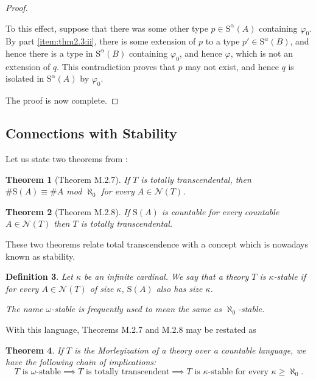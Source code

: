 \documentclass{article}
\newtheorem{theorem}{Theorem}[section]
\newtheorem{definition}[theorem]{Definition}
\theoremstyle{nonumberplain}
\newtheorem{proof}{Proof}
\newcommand{\calN}{\mathcal{N}}
\newcommand{\Stone}{\mathrm{S}}
\newcommand{\card}[1]{\#{#1}}
\begin{document}
\begin{proof}
\begin{itemize}
To this effect, suppose that there was some other type $p \in \Stone^\alpha(A)$ containing $\varphi_0$. By part \ref{item:thm2.3:ii}, there is some extension of $p$ to a type $p' \in \Stone^\alpha(B)$, and hence there is a type in $\Stone^\alpha(B)$ containing $\varphi_0$, and hence $\varphi$, which is not an extension of $q$. This contradiction proves that $p$ may not exist, and hence $q$ is isolated in $\Stone^\alpha(A)$ by $\varphi_0$.
\end{itemize}

The proof is now complete.
\end{proof}

\subsection{Connections with Stability}\label{sec:stability}

Let us state two theorems from \cite{morley}:

\begin{theorem}[Theorem M.2.7]
If $T$ is totally transcendental, then $\card{\Stone(A)} \equiv \card A$ mod $\aleph_0$ for every $A \in \calN(T)$.
\end{theorem}

\begin{theorem}[Theorem M.2.8]
If $\Stone(A)$ is countable for every countable $A \in \calN(T)$ then $T$ is totally transcendental.
\end{theorem}

These two theorems relate total transcendence with a concept which is nowadays known as stability.

\begin{definition}
Let $\kappa$ be an infinite cardinal. We say that a theory $T$ is \emph{$\kappa$-stable} if for every $A \in \calN(T)$ of size $\kappa$, $\Stone(A)$ also has size $\kappa$.

The name $\omega$-stable is frequently used to mean the same as $\aleph_0$-stable.
\end{definition}

With this language, Theorems M.2.7 and M.2.8 may be restated as

\begin{theorem}
If $T$ is the Morleyization of a theory over a countable language, we have the following chain of implications:
\begin{equation}
\text{$T$ is $\omega$-stable} \implies \text{$T$ is totally transcendent} \implies \text{$T$ is $\kappa$-stable for every $\kappa \geq \aleph_0$}.
\end{equation}
\end{theorem}
\end{document}
